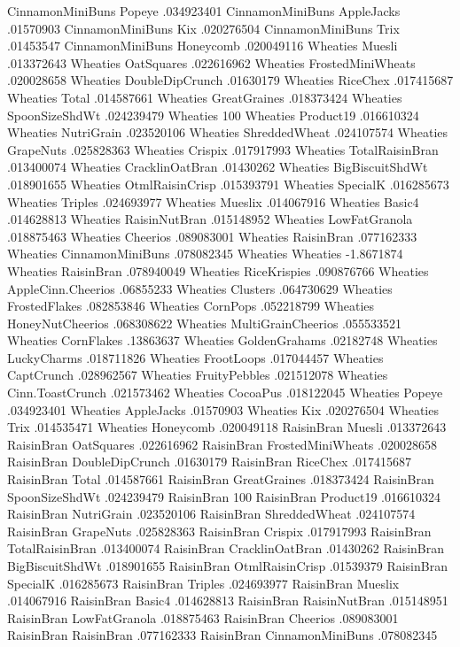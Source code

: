 CinnamonMiniBuns	Popeye	.034923401
CinnamonMiniBuns	AppleJacks	.01570903
CinnamonMiniBuns	Kix	.020276504
CinnamonMiniBuns	Trix	.01453547
CinnamonMiniBuns	Honeycomb	.020049116
Wheaties	Muesli	.013372643
Wheaties	OatSquares	.022616962
Wheaties	FrostedMiniWheats	.020028658
Wheaties	DoubleDipCrunch	.01630179
Wheaties	RiceChex	.017415687
Wheaties	Total	.014587661
Wheaties	GreatGraines	.018373424
Wheaties	SpoonSizeShdWt	.024239479
Wheaties	100%
Wheaties	Product19	.016610324
Wheaties	NutriGrain	.023520106
Wheaties	ShreddedWheat	.024107574
Wheaties	GrapeNuts	.025828363
Wheaties	Crispix	.017917993
Wheaties	TotalRaisinBran	.013400074
Wheaties	CracklinOatBran	.01430262
Wheaties	BigBiscuitShdWt	.018901655
Wheaties	OtmlRaisinCrisp	.015393791
Wheaties	SpecialK	.016285673
Wheaties	Triples	.024693977
Wheaties	Mueslix	.014067916
Wheaties	Basic4	.014628813
Wheaties	RaisinNutBran	.015148952
Wheaties	LowFatGranola	.018875463
Wheaties	Cheerios	.089083001
Wheaties	RaisinBran	.077162333
Wheaties	CinnamonMiniBuns	.078082345
Wheaties	Wheaties	-1.8671874
Wheaties	RaisinBran	.078940049
Wheaties	RiceKrispies	.090876766
Wheaties	AppleCinn.Cheerios	.06855233
Wheaties	Clusters	.064730629
Wheaties	FrostedFlakes	.082853846
Wheaties	CornPops	.052218799
Wheaties	HoneyNutCheerios	.068308622
Wheaties	MultiGrainCheerios	.055533521
Wheaties	CornFlakes	.13863637
Wheaties	GoldenGrahams	.02182748
Wheaties	LuckyCharms	.018711826
Wheaties	FrootLoops	.017044457
Wheaties	CaptCrunch	.028962567
Wheaties	FruityPebbles	.021512078
Wheaties	Cinn.ToastCrunch	.021573462
Wheaties	CocoaPus	.018122045
Wheaties	Popeye	.034923401
Wheaties	AppleJacks	.01570903
Wheaties	Kix	.020276504
Wheaties	Trix	.014535471
Wheaties	Honeycomb	.020049118
RaisinBran	Muesli	.013372643
RaisinBran	OatSquares	.022616962
RaisinBran	FrostedMiniWheats	.020028658
RaisinBran	DoubleDipCrunch	.01630179
RaisinBran	RiceChex	.017415687
RaisinBran	Total	.014587661
RaisinBran	GreatGraines	.018373424
RaisinBran	SpoonSizeShdWt	.024239479
RaisinBran	100%
RaisinBran	Product19	.016610324
RaisinBran	NutriGrain	.023520106
RaisinBran	ShreddedWheat	.024107574
RaisinBran	GrapeNuts	.025828363
RaisinBran	Crispix	.017917993
RaisinBran	TotalRaisinBran	.013400074
RaisinBran	CracklinOatBran	.01430262
RaisinBran	BigBiscuitShdWt	.018901655
RaisinBran	OtmlRaisinCrisp	.01539379
RaisinBran	SpecialK	.016285673
RaisinBran	Triples	.024693977
RaisinBran	Mueslix	.014067916
RaisinBran	Basic4	.014628813
RaisinBran	RaisinNutBran	.015148951
RaisinBran	LowFatGranola	.018875463
RaisinBran	Cheerios	.089083001
RaisinBran	RaisinBran	.077162333
RaisinBran	CinnamonMiniBuns	.078082345
